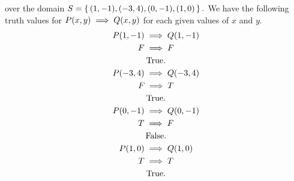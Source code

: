 \documentclass[12pt]{article}
\makeatletter
\newcommand*{\arabicodd}[1]{%
  \expandafter\@arabicodd\csname c@#1\endcsname
}
\newcommand*{\@arabicodd}[1]{%
  \@arabic{\numexpr(#1)*2-1\relax}%
}
\makeatother
\begin{document}
\begin{enumerate}[label=2.\arabicodd*, start=16]
\begin{enumerate}[label=(\alph*)]
              over the domain $S = \set{\qty(1,-1),\qty(-3,4),\qty(0,-1),\qty(1,0)}.$
              We have the following truth values for $P\qty(x,y) \implies Q\qty(x,y)$ for each
              given values of $x$ and $y.$
              \begin{gather*}
                P\qty(1,-1) \implies Q\qty(1,-1)\\
                F \implies F\\
                \qq{True.}\\
                P\qty(-3,4) \implies Q\qty(-3,4)\\
                F \implies T\\
                \qq{True.}\\
                P\qty(0,-1) \implies Q\qty(0,-1)\\
                T \implies F\\
                \qq{False.}\\
                P\qty(1,0) \implies Q\qty(1,0)\\
                T \implies T\\
                \qq{True.}\\
              \end{gather*}
      \end{enumerate}
\end{enumerate}
\end{document}
